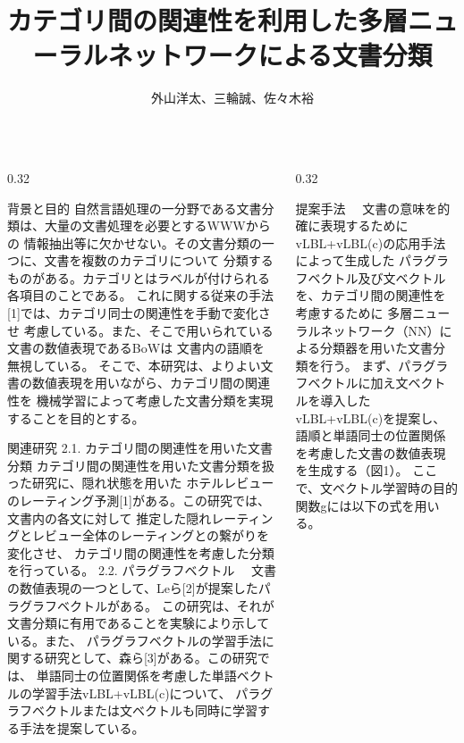 \documentclass[10pt,unicode]{beamer}
\title{カテゴリ間の関連性を利用した多層ニューラルネットワークによる文書分類}
\author{外山洋太、三輪誠、佐々木裕}
\institute{豊田工業大学 工学部 先端工学基礎学科}
\date{}
\newcommand{\columnsize}{0.32}
\begin{document}
\begin{frame}{}
\maketitle
\vspace{-5ex} %
\begin{columns}[t]

\begin{column}{\columnsize\textwidth} %
  \begin{block}{背景と目的}
    自然言語処理の一分野である文書分類は、大量の文書処理を必要とするWWWからの
    情報抽出等に欠かせない。その文書分類の一つに、文書を複数のカテゴリについて
    分類するものがある。カテゴリとはラベルが付けられる各項目のことである。
    これに関する従来の手法[1]では、カテゴリ同士の関連性を手動で変化させ
    考慮している。また、そこで用いられている文書の数値表現であるBoWは
    文書内の語順を無視している。
    そこで、本研究は、よりよい文書の数値表現を用いながら、カテゴリ間の関連性を
    機械学習によって考慮した文書分類を実現することを目的とする。
  \end{block}

  \begin{block}{関連研究}
    2.1. カテゴリ間の関連性を用いた文書分類
    カテゴリ間の関連性を用いた文書分類を扱った研究に、隠れ状態を用いた
    ホテルレビューのレーティング予測[1]がある。この研究では、文書内の各文に対して
    推定した隠れレーティングとレビュー全体のレーティングとの繋がりを変化させ、
    カテゴリ間の関連性を考慮した分類を行っている。
    2.2. パラグラフベクトル
    　文書の数値表現の一つとして、Leら[2]が提案したパラグラフベクトルがある。
    この研究は、それが文書分類に有用であることを実験により示している。また、
    パラグラフベクトルの学習手法に関する研究として、森ら[3]がある。この研究では、
    単語同士の位置関係を考慮した単語ベクトルの学習手法vLBL+vLBL(c)について、
    パラグラフベクトルまたは文ベクトルも同時に学習する手法を提案している。
  \end{block}
\end{column} %

\begin{column}{\columnsize\textwidth} %
  \begin{block}{提案手法}
    　文書の意味を的確に表現するためにvLBL+vLBL(c)の応用手法によって生成した
    パラグラフベクトル及び文ベクトルを、カテゴリ間の関連性を考慮するために
    多層ニューラルネットワーク（NN）による分類器を用いた文書分類を行う。
    まず、パラグラフベクトルに加え文ベクトルを導入したvLBL+vLBL(c)を提案し、
    語順と単語同士の位置関係を考慮した文書の数値表現を生成する（図1）。
    ここで、文ベクトル学習時の目的関数gには以下の式を用いる。


\end{block}
\end{column}
\end{columns}
\end{frame}
\end{document}

